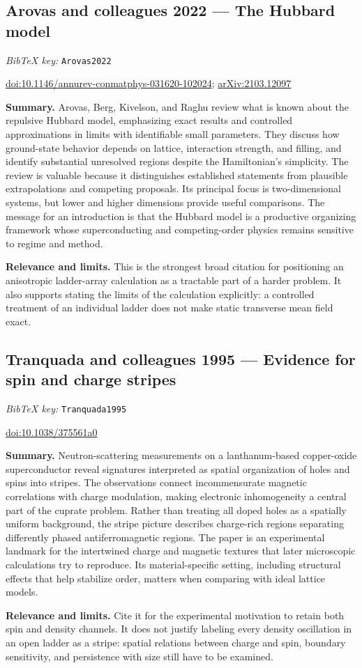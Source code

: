 \documentclass[11pt]{article}
\newcommand{\paper}[2]{\Needspace{8\baselineskip}\subsection{#2}\label{paper:#1}\textit{BibTeX key:} \texttt{#1}\quad\citep{#1}\par}
\newcommand{\doi}[1]{\href{https://doi.org/#1}{doi:#1}}
\newcommand{\arxiv}[1]{\href{https://arxiv.org/abs/#1}{arXiv:#1}}
\newcommand{\summary}{\par\textbf{Summary.} }
\newcommand{\relevance}{\par\textbf{Relevance and limits.} }
\begin{document}
\paper{Arovas2022}{Arovas and colleagues 2022 --- The Hubbard model}
\doi{10.1146/annurev-conmatphys-031620-102024}; \arxiv{2103.12097}
\summary Arovas, Berg, Kivelson, and Raghu review what is known about the repulsive Hubbard model, emphasizing exact results and controlled approximations in limits with identifiable small parameters. They discuss how ground-state behavior depends on lattice, interaction strength, and filling, and identify substantial unresolved regions despite the Hamiltonian's simplicity. The review is valuable because it distinguishes established statements from plausible extrapolations and competing proposals. Its principal focus is two-dimensional systems, but lower and higher dimensions provide useful comparisons. The message for an introduction is that the Hubbard model is a productive organizing framework whose superconducting and competing-order physics remains sensitive to regime and method.
\relevance This is the strongest broad citation for positioning an anisotropic ladder-array calculation as a tractable part of a harder problem. It also supports stating the limits of the calculation explicitly: a controlled treatment of an individual ladder does not make static transverse mean field exact.

\paper{Tranquada1995}{Tranquada and colleagues 1995 --- Evidence for spin and charge stripes}
\doi{10.1038/375561a0}
\summary Neutron-scattering measurements on a lanthanum-based copper-oxide superconductor reveal signatures interpreted as spatial organization of holes and spins into stripes. The observations connect incommensurate magnetic correlations with charge modulation, making electronic inhomogeneity a central part of the cuprate problem. Rather than treating all doped holes as a spatially uniform background, the stripe picture describes charge-rich regions separating differently phased antiferromagnetic regions. The paper is an experimental landmark for the intertwined charge and magnetic textures that later microscopic calculations try to reproduce. Its material-specific setting, including structural effects that help stabilize order, matters when comparing with ideal lattice models.
\relevance Cite it for the experimental motivation to retain both spin and density channels. It does not justify labeling every density oscillation in an open ladder as a stripe: spatial relations between charge and spin, boundary sensitivity, and persistence with size still have to be examined.
\end{document}

